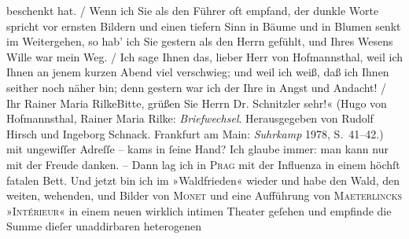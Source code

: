 {{{                        beschenkt hat.{ / }Wenn ich Sie als den Führer oft empfand, der dunkle Worte spricht vor
                        ernsten Bildern und einen tiefern Sinn in Bäume und in Blumen senkt im
                        Weitergehen, so hab' ich Sie gestern als den Herrn gefühlt, und Ihres Wesens
                        Wille war mein Weg.{ / }Ich sage Ihnen das, lieber Herr von
                           Hofmannsthal, weil ich Ihnen an jenem kurzen Abend viel verschwieg;
                        und weil ich weiß, daß ich Ihnen seither noch näher bin; denn gestern war
                        ich der Ihre in Angst und Andacht!{ / }Ihr Rainer Maria RilkeBitte, grüßen Sie Herrn Dr. Schnitzler
                        sehr!« (Hugo von
                        Hofmannsthal, Rainer Maria Rilke:
                        \emph{Briefwechsel}. Herausgegeben von Rudolf Hirsch und
                     Ingeborg Schnack. Frankfurt am Main:
                        \emph{Suhrkamp}{ }1978, S. 41–42.)}}}\label{K_L04536-4} mit ungewiſſer Adreſſe –
               kams in{ }ſeine Hand? Ich glaube immer: man kann nur mit der Freude danken. – Dann lag
               ich in \textsc{Prag} mit der {\pb}Influenza in einem höchſt
               fatalen Bett. Und jetzt bin ich im »Waldfrieden« wieder und habe den Wald, den weiten, wehenden, und Bilder von
                  \textsc{Monet} und eine Aufführung von \textsc{Maeterlincks} »\textsc{Intérieur}« in einem neuen wirklich intimen Theater geſehen und empfinde die Summe dieſer unaddirbaren heterogenen
